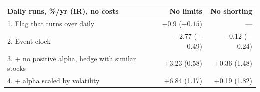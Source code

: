 \small
\begin{tabular}{lrr}
\toprule
Daily runs, \%/yr (IR), no costs & No limits & No shorting \\
\midrule
1. Flag that turns over daily & $-0.9$ ($-0.15$) & --- \\
2. Event clock & $-$2.77 ($-$0.49) & $-$0.12 ($-$0.24) \\
3. + no positive alpha, hedge with similar stocks & +3.23 (0.58) & +0.36 (1.48) \\
4. + alpha scaled by volatility & +6.84 (1.17) & +0.19 (1.82) \\
\bottomrule
\end{tabular}